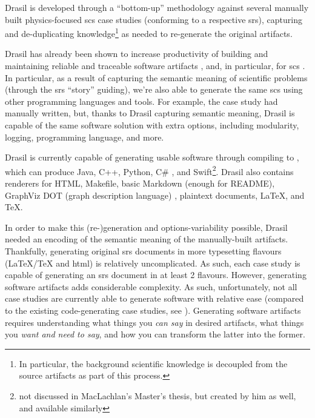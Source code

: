 Drasil is developed through a ``bottom-up'' methodology against several manually
built physics-focused \acs{scs} case studies (conforming to a respective
\acs{srs}), capturing and de-duplicating knowledge\footnote{In particular, the
      background scientific knowledge is decoupled from the source artifacts as part
      of this process.} as needed to re-generate the original artifacts.

\caseStudiesTable{}

Drasil has already been shown to increase productivity of building and
maintaining reliable and traceable software artifacts \cite{SzymczakEtAl2016},
and, in particular, for \acs{scs} \cite{Smith2018}. In particular, as a result
of capturing the semantic meaning of scientific problems (through the \acs{srs}
``story'' guiding), we're also able to generate the same \acs{scs} using other
programming languages and tools. For example, the  case study had
manually written, but, thanks to Drasil capturing semantic meaning, Drasil is
capable of
the same software solution with extra options, including modularity, logging,
programming language, and more.

Drasil is currently capable of generating usable software through compiling to
, which can produce Java, C++, Python, C\# \cite{MacLachlan2020}, and
Swift\footnote{not discussed in MacLachlan's Master's thesis, but created by him
      as well, and available similarly}. Drasil also contains renderers for HTML,
Makefile, basic Markdown (enough for README), GraphViz DOT (graph description
language) \cite{Gansner1993}, plaintext documents, \LaTeX{}, and
\TeX{}.

In order to make this (re-)generation and options-variability possible, Drasil
needed an encoding of the semantic meaning of the manually-built artifacts.
Thankfully, generating original \acs{srs} documents in more typesetting flavours
(\LaTeX{}/\TeX{} and \acs{html}) is relatively uncomplicated. As such, each case
study is capable of generating an \acs{srs} document in at least 2 flavours.
However, generating software artifacts adds considerable complexity. As such,
unfortunately, not all case studies are currently able to generate software with
relative ease (compared to the existing code-generating case studies, see
). Generating software artifacts requires
understanding what things you \textit{can say} in desired artifacts, what things
you \textit{want and need to say}, and how you can transform the latter into the
former.

